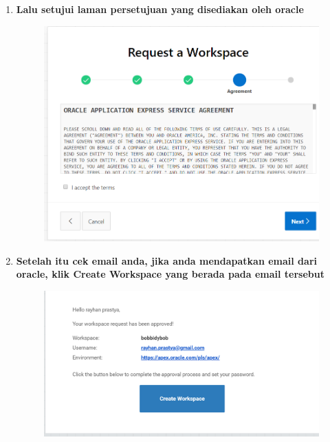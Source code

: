 \begin{enumerate}
\item \textbf{Lalu setujui laman persetujuan yang disediakan oleh oracle}
\begin{figure}[H]
    \centering
    \includegraphics[scale=0.3]{figures/6.png}
    \label{6}
\end{figure}


\item \textbf{Setelah itu cek email anda, jika anda mendapatkan email dari oracle, klik Create Workspace yang berada pada email tersebut}
\begin{figure}[H]
    \centering
    \includegraphics[scale=0.3]{figures/7.png}
    \label{7}
\end{figure}



\end{enumerate}
